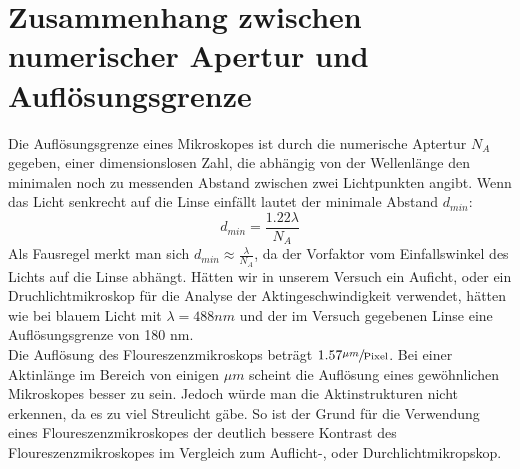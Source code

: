 \section{Zusammenhang zwischen numerischer Apertur und Auflösungsgrenze}
Die Auflösungsgrenze eines Mikroskopes ist durch die numerische Aptertur $N_{A}$ gegeben,
einer dimensionslosen Zahl, die abhängig von der Wellenlänge den minimalen noch zu messenden
Abstand zwischen zwei Lichtpunkten angibt. Wenn das Licht senkrecht auf die Linse einfällt
lautet der minimale Abstand $d_{min}$:
\begin{equation}
  d_{min} = \frac{1.22 \lambda}{N_{A}}
\end{equation}
Als Fausregel merkt man sich $d_{min} \approx \frac{ \lambda}{N_{A}}$, da
der Vorfaktor vom Einfallswinkel des Lichts auf die Linse abhängt.
Hätten wir in unserem Versuch ein Auficht, oder ein Druchlichtmikroskop
für die Analyse der Aktingeschwindigkeit verwendet, hätten wie bei blauem
Licht mit $ \lambda = 488nm$ und der im Versuch gegebenen Linse eine
Auflösungsgrenze von 180 nm. \\
Die Auflösung des Floureszenzmikroskops beträgt $1.57 \sfrac{\mu m}{\text{Pixel}}$.
Bei einer Aktinlänge im Bereich von einigen $\mu m$ \cite{FOPRA_molecular_motors}
scheint die Auflösung eines gewöhnlichen Mikroskopes besser zu sein.
Jedoch würde man die Aktinstrukturen nicht erkennen, da es zu viel Streulicht gäbe.
So ist der Grund für die Verwendung eines Floureszenzmikroskopes der
deutlich bessere Kontrast des Floureszenzmikroskopes im Vergleich zum Auflicht-,
oder Durchlichtmikropskop.

